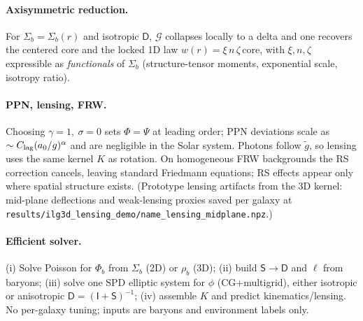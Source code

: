 \documentclass[12pt,a4paper]{article}
\begin{document}
\paragraph{Axisymmetric reduction.} For $\Sigma_b=\Sigma_b(r)$ and isotropic $\mathsf D$, $\mathcal G$ collapses locally to a delta and one recovers the centered core and the locked 1D law $w(r)=\xi\,n\,\zeta\,\mathrm{core}$, with $\xi, n, \zeta$ expressible as \emph{functionals} of $\Sigma_b$ (structure-tensor moments, exponential scale, isotropy ratio).

\paragraph{PPN, lensing, FRW.} Choosing $\gamma=1,\ \sigma=0$ sets $\Phi=\Psi$ at leading order; PPN deviations scale as $\sim C_{\rm lag}(a_0/g)^\alpha$ and are negligible in the Solar system. Photons follow $\tilde g$, so lensing uses the same kernel $K$ as rotation. On homogeneous FRW backgrounds the RS correction cancels, leaving standard Friedmann equations; RS effects appear only where spatial structure exists. (Prototype lensing artifacts from the 3D kernel: mid-plane deflections and weak-lensing proxies saved per galaxy at \texttt{results/ilg3d\_lensing\_demo/\<name\>\_lensing\_midplane.npz}.)

\paragraph{Efficient solver.} (i) Solve Poisson for $\Phi_b$ from $\Sigma_b$ (2D) or $\rho_b$ (3D); (ii) build $\mathsf S\!\to\!\mathsf D$ and $\ell$ from baryons; (iii) solve one SPD elliptic system for $\phi$ (CG+multigrid), either isotropic or anisotropic $\mathsf D=(\mathsf I+\mathsf S)^{-1}$; (iv) assemble $K$ and predict kinematics/lensing. No per-galaxy tuning; inputs are baryons and environment labels only.
\end{document}
